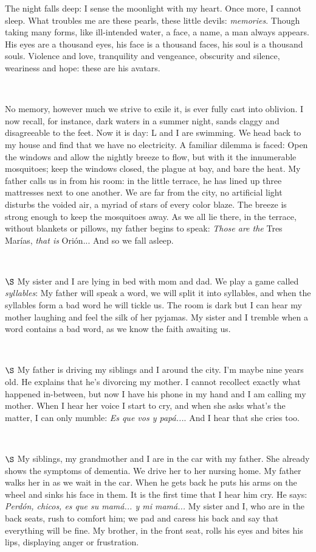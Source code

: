 \documentclass[a4paper, 12pt]{article}
\begin{document}
The night falls deep: I sense the moonlight with my heart. Once more, I cannot
sleep. What troubles me are these pearls, these little devils:
\textit{memories}. Though taking many forms, like ill-intended water, a face, a
name, a man always appears. His eyes are a thousand eyes, his face is a
thousand faces, his soul is a thousand souls. Violence and love, tranquility
and vengeance, obscurity and silence, weariness and hope: these are his
avatars. 

~

No memory, however much we strive to exile it, is ever fully cast into oblivion.
I now recall, for instance, dark waters in a summer night, sands claggy and
disagreeable to the feet. Now it is day: L and I are swimming.  We head back to
my house and find that we have no electricity. A familiar dilemma is
faced: Open the windows and allow the nightly breeze to flow, but with it the
innumerable mosquitoes; keep the windows closed, the plague at bay,
and bare the heat. My father calls us in from his room: in the little terrace,
he has lined up three mattresses next to one another. We are far from the city,
no artificial light disturbs the voided air, a myriad of stars of every
color blaze. The breeze is strong enough to keep the mosquitoes 
away. As we all lie there, in the terrace, without blankets or pillows,
my father begins to speak: \textit{Those are the} Tres Marías, \textit{that is } Orión...
And so we fall asleep.

~ 


$\S$ My sister and I are lying in bed with mom and dad. We play a game called
\textit{syllables}: My father will speak a word, we will split it into
syllables, and when the syllables form a bad word he will tickle us. The room
is dark but I can hear my mother laughing and feel the silk of her pyjamas. My
sister and I tremble when a word contains a bad word, as we know the faith
awaiting us.

~ 

$\S$ My father is driving my siblings and I around the city. I'm maybe nine
years old. He explains that he's divorcing my mother. I cannot recollect
exactly what happened in-between, but now I have his phone in my hand and I am
calling my mother. When I hear her voice I start to cry, and when she asks
what's the matter, I can only mumble: \textit{Es que vos y papá...}. And I hear
that she cries too.

~ 

$\S$ My siblings, my grandmother and I are in the car with my father. She
already shows the symptoms of dementia. We drive her to her nursing home. My
father walks her in as we wait in the car. When he gets back he puts his arms
on the wheel and sinks his face in them. It is the first time that I hear
him cry. He says: \textit{Perdón, chicos, es que su mamá... y mi mamá...} My
sister and I, who are in the back seats, rush to comfort him; we pad and caress
his back and say that everything will be fine. My brother, in the front seat,
rolls his eyes and bites his lips, displaying anger or frustration.
\end{document}
